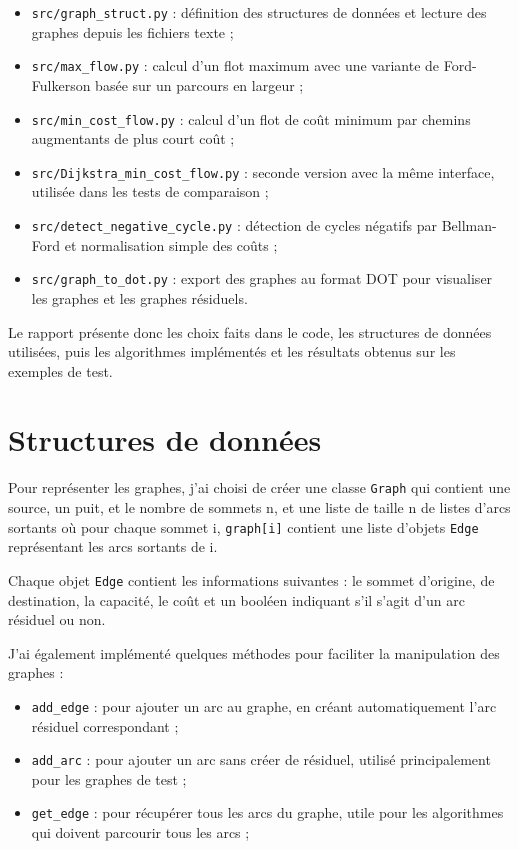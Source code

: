 \documentclass{rapportClass}
\begin{document}
\begin{itemize}
    \item \texttt{src/graph\_struct.py} : définition des structures de données et lecture des graphes depuis les fichiers texte ;
    \item \texttt{src/max\_flow.py} : calcul d'un flot maximum avec une variante de Ford-Fulkerson basée sur un parcours en largeur ;
    \item \texttt{src/min\_cost\_flow.py} : calcul d'un flot de coût minimum par chemins augmentants de plus court coût ;
    \item \texttt{src/Dijkstra\_min\_cost\_flow.py} : seconde version avec la même interface, utilisée dans les tests de comparaison ;
    \item \texttt{src/detect\_negative\_cycle.py} : détection de cycles négatifs par Bellman-Ford et normalisation simple des coûts ;
    \item \texttt{src/graph\_to\_dot.py} : export des graphes au format DOT pour visualiser les graphes et les graphes résiduels.
\end{itemize}

Le rapport présente donc les choix faits dans le code, les structures de données utilisées, puis les algorithmes implémentés et les résultats obtenus sur les exemples de test.

\chapter{Structures de données}
Pour représenter les graphes, j'ai choisi de créer une classe \texttt{Graph} qui contient une source, un puit, et le 
nombre de sommets n, et une liste de taille n de listes d'arcs sortants où pour chaque sommet i, \texttt{graph[i]} 
contient une liste d'objets \texttt{Edge} représentant les arcs sortants de i. 

Chaque objet \texttt{Edge} contient les informations suivantes : le sommet d'origine, de destination, la capacité, 
le coût et un booléen indiquant s'il s'agit d'un arc résiduel ou non. 

J'ai également implémenté quelques méthodes pour faciliter la manipulation des graphes :
\begin{itemize}
    \item \texttt{add\_edge} : pour ajouter un arc au graphe, en créant automatiquement l'arc résiduel correspondant ;
    \item \texttt{add\_arc} : pour ajouter un arc sans créer de résiduel, utilisé principalement pour les graphes de test ;
    \item \texttt{get\_edge} : pour récupérer tous les arcs du graphe, utile pour les algorithmes qui doivent parcourir tous les arcs ;
\end{itemize}
\end{document}
